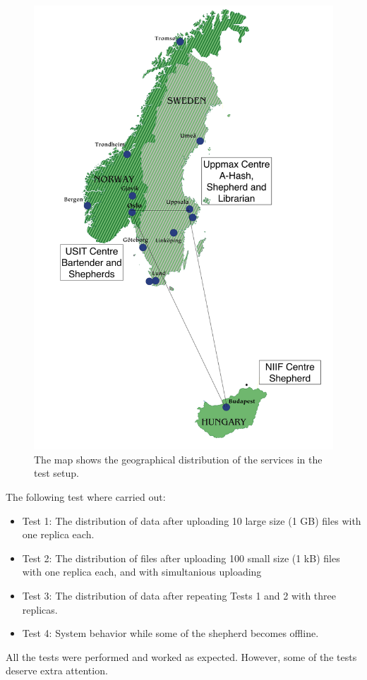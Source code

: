 \documentclass[final]{ieee}
\begin{document}
\begin{figure}
\centering
\includegraphics[width=0.7\columnwidth]{map}
\caption{The map shows the geographical distribution of the services in the test setup.}
\label{fig:map}
\end{figure}  

The following test where carried out:

\begin{itemize}
\item Test 1: The distribution of data after uploading 10 large size (1 GB)
  files with one replica each.  
\item Test 2: The distribution of files after uploading 100 small size (1 kB)
  files with one replica each, and with simultanious uploading
\item Test 3: The distribution of data after repeating Tests 1 and 2 with three replicas.  
\item Test 4: System behavior while some of the shepherd becomes offline.   
\end{itemize}

All the tests were performed and worked as expected. However, some of
the tests deserve extra attention.
\end{document}
